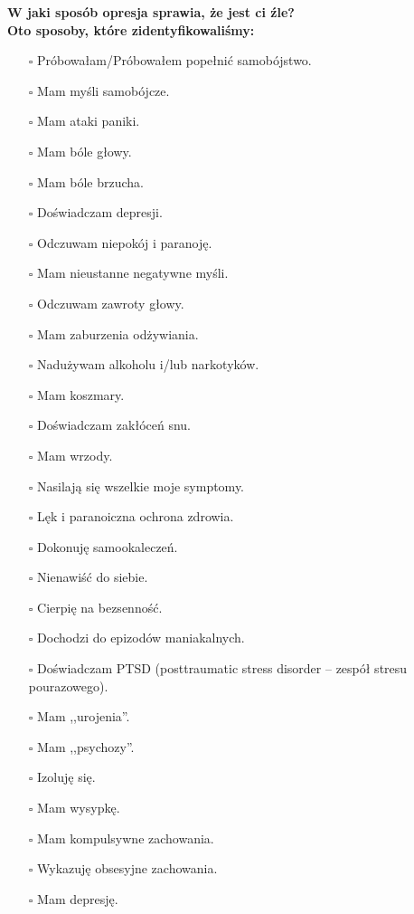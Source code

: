 \noindent\textcolor{ProcessBlue}{\textbf{\Large{W jaki sposób opresja sprawia, że jest ci źle?}}}\\
\textbf{\large{Oto sposoby, które zidentyfikowaliśmy:}}
\begin{multicols}{2}
\begin{itemize}
\item[$\square$]{Próbowałam/Próbowałem popełnić samobójstwo.}
\item[$\square$]{Mam myśli samobójcze.}
\item[$\square$]{Mam ataki paniki.}
\item[$\square$]{Mam bóle głowy.}
\item[$\square$]{Mam bóle brzucha.}
\item[$\square$]{Doświadczam depresji.}
\item[$\square$]{Odczuwam niepokój i paranoję.}
\item[$\square$]{Mam nieustanne negatywne myśli.}
\item[$\square$]{Odczuwam zawroty głowy.}
\item[$\square$]{Mam zaburzenia odżywiania.}
\item[$\square$]{Nadużywam alkoholu i/lub narkotyków.}
\item[$\square$]{Mam koszmary.}
\item[$\square$]{Doświadczam zakłóceń snu.}
\item[$\square$]{Mam wrzody.}
\item[$\square$]{Nasilają się wszelkie moje symptomy.}
\item[$\square$]{Lęk i paranoiczna ochrona zdrowia.}
\item[$\square$]{Dokonuję samookaleczeń.}
\item[$\square$]{Nienawiść do siebie.}
\item[$\square$]{Cierpię na bezsenność.}
\item[$\square$]{Dochodzi do epizodów maniakalnych.}
\item[$\square$]{Doświadczam PTSD (posttraumatic stress disorder -- zespół stresu pourazowego).}
\item[$\square$]{Mam ,,urojenia''.}
\item[$\square$]{Mam ,,psychozy''.}
\item[$\square$]{Izoluję się.}
\item[$\square$]{Mam wysypkę.}
\item[$\square$]{Mam kompulsywne zachowania.}
\item[$\square$]{Wykazuję obsesyjne zachowania.}
\item[$\square$]{Mam depresję.}
\end{itemize}
\end{multicols}



